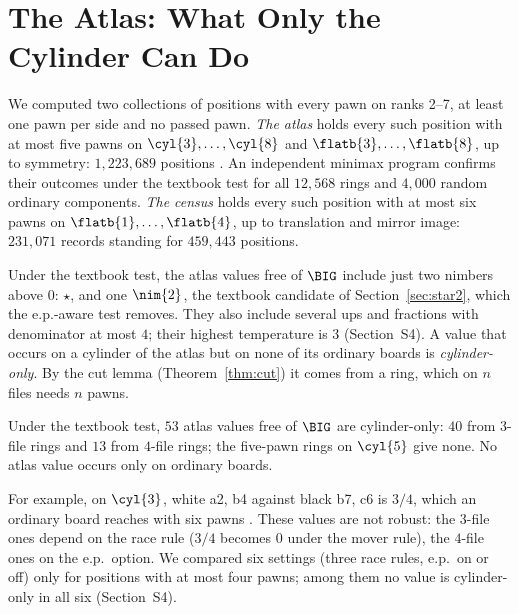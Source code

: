 \section{The Atlas: What Only the Cylinder Can Do}\label{sec:atlas}

We computed two collections of positions with every pawn on ranks 2--7, at least one pawn per side and no
passed pawn. \emph{The atlas} holds every such position with at most five pawns on
$\cyl{3},\dots,\cyl{8}$ and $\flatb{3},\dots,\flatb{8}$, up to symmetry: $1{,}223{,}689$ positions
. An independent minimax program confirms their outcomes under the textbook test for all
$12{,}568$ rings and $4{,}000$ random ordinary components. \emph{The census} holds every such position
with at most six pawns on $\flatb{1},\dots,\flatb{4}$, up to translation and mirror image:
$231{,}071$ records standing for $459{,}443$ positions.

Under the textbook test, the atlas values free of $\BIG$ include just two nimbers above $0$: $\star$, and one
$\nim{2}$, the textbook candidate of Section~\ref{sec:star2}, which the e.p.-aware test removes. They also
include several ups and fractions with denominator at most $4$; their highest temperature is
$3$  (Section~S4). A value that occurs on a cylinder of the atlas but on none of its ordinary boards is \emph{cylinder-only}. By the cut
lemma (Theorem~\ref{thm:cut}) it comes from a ring, which on $n$ files needs $n$ pawns.

\begin{proposition}[\lab{C1}]\label{prop:cylonly}
Under the textbook test, $53$ atlas values free of $\BIG$ are cylinder-only: $40$ from $3$-file rings and
$13$ from $4$-file rings; the five-pawn rings on $\cyl{5}$ give none. No atlas value occurs only on ordinary boards.
\end{proposition}

For example, on $\cyl{3}$, white a2, b4 against black b7, c6 is $3/4$, which an ordinary board reaches with six pawns . These values are not robust: the $3$-file ones depend on the race rule ($3/4$ becomes $0$ under the mover rule), the $4$-file ones on
the e.p.\ option. We compared six settings (three race rules, e.p.\ on or off) only for positions with at most four pawns; among
them no value is cylinder-only in all six  (Section~S4).
